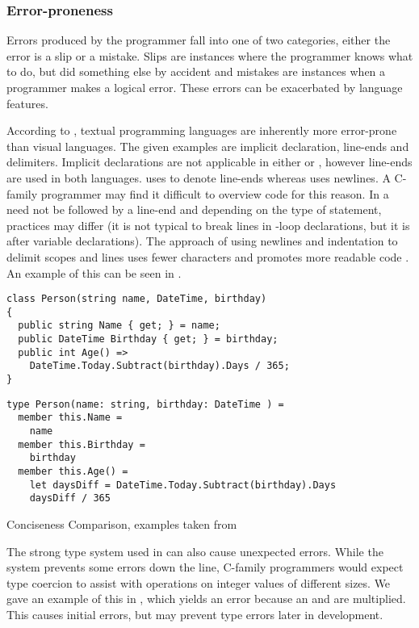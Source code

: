 \subsubsection{Error-proneness}
Errors produced by the programmer fall into one of two categories, either the error is a slip or a mistake. Slips are instances where the programmer knows what to do, but did something else by accident and mistakes are instances when a programmer makes a logical error. These errors can be exacerbated by language features.

According to \cite{green1996usability}, textual programming languages are inherently more error-prone than visual languages. The given examples are implicit declaration, line-ends and delimiters. Implicit declarations are not applicable in either \cs or \fs, however line-ends are used in both languages. \cs uses \m{;} to denote line-ends whereas \fs uses newlines. A C-family programmer may find it difficult to overview \fs code for this reason. In \cs a \m{;} need not be followed by a line-end and depending on the type of statement, practices may differ (it is not typical to break lines in -loop declarations, but it is after variable declarations).
The \fs approach of using newlines and indentation to delimit scopes and lines uses fewer characters and promotes more readable code \needcite{}. An example of this can be seen in .

\begin{listing}[H]
\begin{verbatim}
class Person(string name, DateTime, birthday)
{
  public string Name { get; } = name;
  public DateTime Birthday { get; } = birthday;
  public int Age() =>
    DateTime.Today.Subtract(birthday).Days / 365;
}
\end{verbatim}
\begin{verbatim}
type Person(name: string, birthday: DateTime ) =
  member this.Name =
    name
  member this.Birthday =
    birthday
  member this.Age() =
    let daysDiff = DateTime.Today.Subtract(birthday).Days
    daysDiff / 365
\end{verbatim}
\caption{Conciseness Comparison, examples taken from \cite{wlaschin2017FsharpForCsharpProgrammers}}
\label{lst:con-comp}
\end{listing}

The strong type system used in \fs can also cause unexpected errors. While the system prevents some errors down the line, C-family programmers would expect type coercion to assist with operations on integer values of different sizes. We gave an example of this in , which yields an error because an  and  are multiplied. This causes initial errors, but may prevent type errors later in development\cite{ray2014large}.

